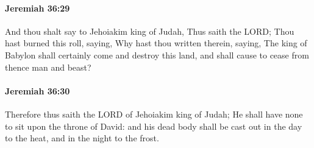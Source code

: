 		\paragraph{Jeremiah 36:29} %
			\label{JEREMIAH-36-29}

			And thou shalt say to Jehoiakim king of Judah, Thus saith the LORD; Thou hast burned this roll, saying, Why hast thou written therein, saying, The king of Babylon shall certainly come and destroy this land, and shall cause to cease from thence man and beast?


		\paragraph{Jeremiah 36:30} %
			\label{JEREMIAH-36-30}

			Therefore thus saith the LORD of Jehoiakim king of Judah; He shall have none to sit upon the throne of David: and his dead body shall be cast out in the day to the heat, and in the night to the frost.

